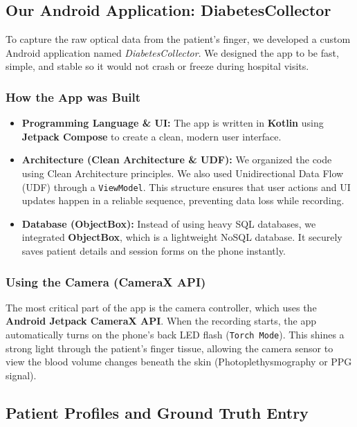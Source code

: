 \subsection{Our Android Application: DiabetesCollector}
To capture the raw optical data from the patient's finger, we developed a custom Android application named \textit{DiabetesCollector}. We designed the app to be fast, simple, and stable so it would not crash or freeze during hospital visits.

\subsubsection{How the App was Built}
\begin{itemize}
    \item \textbf{Programming Language \& UI:} The app is written in \textbf{Kotlin} using \textbf{Jetpack Compose} to create a clean, modern user interface.
    \item \textbf{Architecture (Clean Architecture \& UDF):} We organized the code using Clean Architecture principles. We also used Unidirectional Data Flow (UDF) through a \texttt{ViewModel}. This structure ensures that user actions and UI updates happen in a reliable sequence, preventing data loss while recording.
    \item \textbf{Database (ObjectBox):} Instead of using heavy SQL databases, we integrated \textbf{ObjectBox}, which is a lightweight NoSQL database. It securely saves patient details and session forms on the phone instantly.
\end{itemize}

\subsubsection{Using the Camera (CameraX API)}
The most critical part of the app is the camera controller, which uses the \textbf{Android Jetpack CameraX API}. When the recording starts, the app automatically turns on the phone’s back LED flash (\texttt{Torch Mode}). This shines a strong light through the patient’s finger tissue, allowing the camera sensor to view the blood volume changes beneath the skin (Photoplethysmography or PPG signal).

\subsection{Patient Profiles and Ground Truth Entry}

